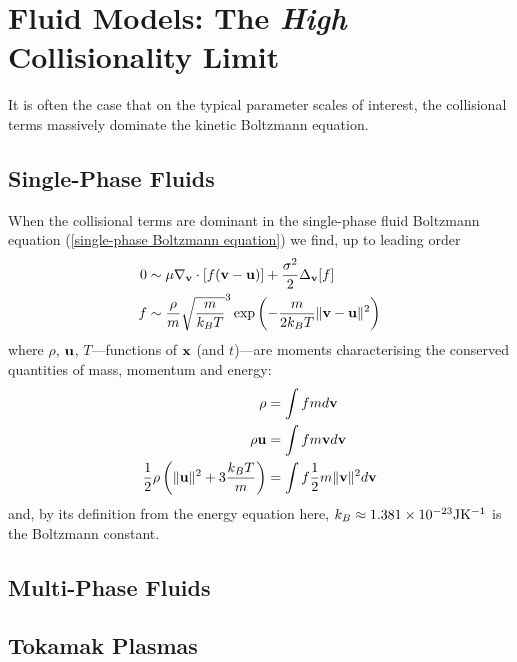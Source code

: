\section{Fluid Models: The \emph{High} Collisionality Limit}
    It is often the case that on the typical parameter scales of interest, the collisional terms massively dominate the kinetic Boltzmann equation. 
    
    \subsection{Single-Phase Fluids}
        When the collisional terms are dominant in the single-phase fluid Boltzmann equation (\ref{single-phase Boltzmann equation}) we find, up to leading order
        \begin{align}
            0  &\sim  \mu\nabla_{\mathbf{v}}\cdot[f(\mathbf{v} - \mathbf{u})] + \frac{\sigma^{2}}{2}\Delta_{\mathbf{v}}[f]  \\
            f  &\sim  \frac{\rho}{m}\sqrt{\frac{m}{k_{B}T}}^{3}\exp\left(- \frac{m}{2k_{B}T}\|\mathbf{v} - \mathbf{u}\|^{2}\right)
        \end{align}
        where $\rho$, $\mathbf{u}$, $T$—functions of $\mathbf{x}$ (and $t$)—are moments characterising the conserved quantities of mass, momentum and energy:
        \begin{align}
            \rho  &=  \int fmd\mathbf{v}  \\
            \rho\mathbf{u}  &=  \int fm\mathbf{v} d\mathbf{v}  \\
            \frac{1}{2}\rho\left(\|\mathbf{u}\|^{2} + 3\frac{k_{B}T}{m}\right)  &=  \int f\frac{1}{2}m\|\mathbf{v}\|^{2}d\mathbf{v}
        \end{align}
        and, by its definition from the energy equation here,  $k_{B}  \approx  1.381\times10^{- 23}\mathrm{J}\mathrm{K}^{- 1}$ is the Boltzmann constant.
    
    \subsection{Multi-Phase Fluids}
    \subsection{Tokamak Plasmas}